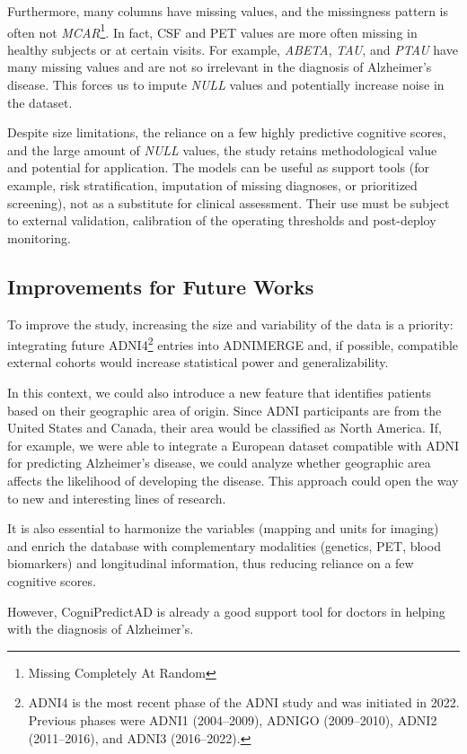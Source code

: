 Furthermore, many columns have missing values, and the missingness pattern is often not \textit{MCAR}\footnote{Missing Completely At Random}. In fact, CSF and PET values are more often missing in healthy subjects or at certain visits. For example, \textit{ABETA}, \textit{TAU}, and \textit{PTAU} have many missing values and are not so irrelevant in the diagnosis of Alzheimer's disease. This forces us to impute \textit{NULL} values and potentially increase noise in the dataset.

\vspace{2mm}

Despite size limitations, the reliance on a few highly predictive cognitive scores, and the large amount of \textit{NULL} values, the study retains methodological value and potential for application. The models can be useful as support tools (for example, risk stratification, imputation of missing diagnoses, or prioritized screening), not as a substitute for clinical assessment. Their use must be subject to external validation, calibration of the operating thresholds and post-deploy monitoring.

\newpage

\subsection{Improvements for Future Works}
To improve the study, increasing the size and variability of the data is a priority: integrating future ADNI4\footnote{ADNI4 is the most recent phase of the ADNI study and was initiated in 2022. Previous phases were ADNI1 (2004–2009), ADNIGO (2009–2010), ADNI2 (2011–2016), and ADNI3 (2016–2022).} entries into ADNIMERGE and, if possible, compatible external cohorts would increase statistical power and generalizability.

\vspace{2mm}

In this context, we could also introduce a new feature that identifies patients based on their geographic area of origin. Since ADNI participants are from the United States and Canada, their area would be classified as North America. If, for example, we were able to integrate a European dataset compatible with ADNI for predicting Alzheimer's disease, we could analyze whether geographic area affects the likelihood of developing the disease. This approach could open the way to new and interesting lines of research.

\vspace{2mm}

It is also essential to harmonize the variables (mapping and units for imaging) and enrich the database with complementary modalities (genetics, PET, blood biomarkers) and longitudinal information, thus reducing reliance on a few cognitive scores.

However, CogniPredictAD is already a good support tool for doctors in helping with the diagnosis of Alzheimer's.

\columnbreak
\vspace*{\fill} %

